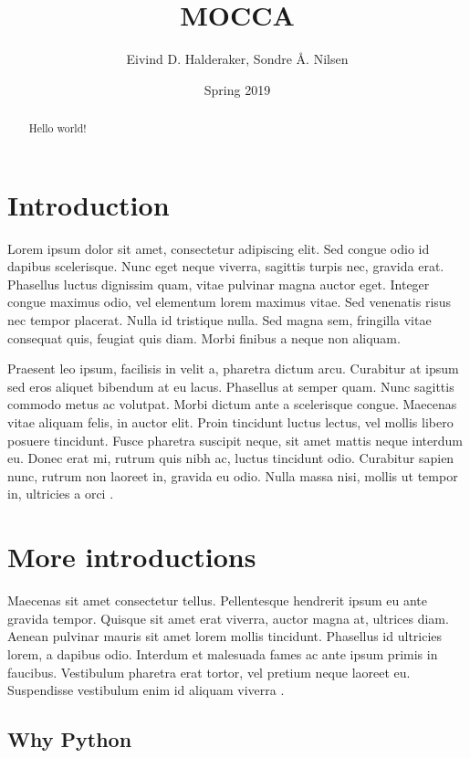 \documentclass[12pt,a4paper,oneside,article]{memoir}
\title{MOCCA}
\author{Eivind D. Halderaker, Sondre Å. Nilsen}
\date{Spring 2019}
\numberwithin{equation}{chapter}
\begin{document}
\maketitle
\tableofcontents

\begin{abstract}
  Hello world!
\end{abstract}

\section{Introduction}
\label{sec:introduction}
Lorem ipsum dolor sit amet, consectetur adipiscing elit. Sed congue odio id
dapibus scelerisque. Nunc eget neque viverra, sagittis turpis nec, gravida erat.
Phasellus luctus dignissim quam, vitae pulvinar magna auctor eget. Integer
congue maximus odio, vel elementum lorem maximus vitae. Sed venenatis risus nec
tempor placerat. Nulla id tristique nulla. Sed magna sem, fringilla vitae
consequat quis, feugiat quis diam. Morbi finibus a neque non aliquam.

Praesent leo ipsum, facilisis in velit a, pharetra dictum arcu. Curabitur at
ipsum sed eros aliquet bibendum at eu lacus. Phasellus at semper quam. Nunc
sagittis commodo metus ac volutpat. Morbi dictum ante a scelerisque congue.
Maecenas vitae aliquam felis, in auctor elit. Proin tincidunt luctus lectus, vel
mollis libero posuere tincidunt. Fusce pharetra suscipit neque, sit amet mattis
neque interdum eu. Donec erat mi, rutrum quis nibh ac, luctus tincidunt odio.
Curabitur sapien nunc, rutrum non laoreet in, gravida eu odio. Nulla massa nisi,
mollis ut tempor in, ultricies a orci \cite{ayoola2015Camera}.

\section{More introductions}
\label{sec:more-introduction}
Maecenas sit amet consectetur tellus. Pellentesque hendrerit ipsum eu ante
gravida tempor. Quisque sit amet erat viverra, auctor magna at, ultrices diam.
Aenean pulvinar mauris sit amet lorem mollis tincidunt. Phasellus id ultricies
lorem, a dapibus odio. Interdum et malesuada fames ac ante ipsum primis in
faucibus. Vestibulum pharetra erat tortor, vel pretium neque laoreet eu.
Suspendisse vestibulum enim id aliquam viverra
\cite{munroe2012Approximation}.

\subsection{Why Python}
\label{sec:why-python}
\end{document}
